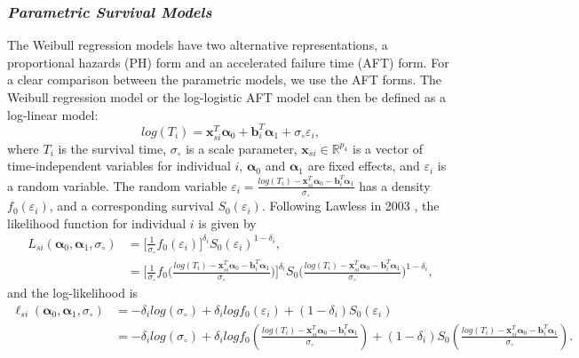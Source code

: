 \subsubsection*{\textit{Parametric Survival Models}}

The Weibull regression models have two alternative representations, a proportional hazards (PH) form and an accelerated failure time (AFT) form. For a clear comparison between the parametric models, we use the AFT forms. The Weibull regression model or the log-logistic AFT model can then be defined as a log-linear model:
\begin{equation}
    log(T_i) = \boldsymbol{x}_{si}^T \boldsymbol{\alpha}_0 + \boldsymbol{b}_i^T  \boldsymbol{\alpha}_1 +\sigma_{\circ} \varepsilon_i,
\end{equation}
where $T_i$ is the survival time, $\sigma_{\circ}$ is a scale parameter, $\boldsymbol{x}_{si}\in \mathbb{R}^{p_4}$ is a vector of time-independent variables for individual $i$, $\boldsymbol{\alpha}_0$ and $\boldsymbol{\alpha}_1$ are fixed effects, and $\varepsilon_i$ is a random variable. The random variable $\varepsilon_i = \frac{log(T_i) - \boldsymbol{x}_{si}^T \boldsymbol{\alpha}_0 - \boldsymbol{b}_i^T  \boldsymbol{\alpha}_1}{\sigma_{\circ} }$ has a density $f_0(\varepsilon_i)$, and a corresponding survival $S_0(\varepsilon_i)$.
Following Lawless in 2003 \cite{lawless2011statistical}, the likelihood function for individual $i$ is given by
\begin{equation}
    \begin{split}
        L_{si} (\boldsymbol{\alpha}_0,\boldsymbol{\alpha}_1,\sigma_{\circ}) &= \Big[ \frac{1}{\sigma_{\circ}} f_0(\varepsilon_i) \Big]^{\delta_i} S_0(\varepsilon_i)^{1-\delta_i}, \\
        &=  \Big[ \frac{1}{\sigma_{\circ}} f_0 \big( \frac{log(T_i) - \boldsymbol{x}_{si}^T \boldsymbol{\alpha}_0 - \boldsymbol{b}_i^T  \boldsymbol{\alpha}_1}{\sigma_{\circ} } \big) \Big]^{\delta_i} 
        S_0 \big( \frac{log(T_i) - \boldsymbol{x}_{si}^T \boldsymbol{\alpha}_0 - \boldsymbol{b}_i^T  \boldsymbol{\alpha}_1}{\sigma_{\circ} } \big)^{1-\delta_i},
    \end{split}
\end{equation}
and the log-likelihood is 
\begin{equation}
    \begin{split}
         \ell_{si} (\boldsymbol{\alpha}_0,\boldsymbol{\alpha}_1,\sigma_{\circ}) &= -\delta_i log(\sigma_{\circ}) + \delta_i log f_0(\varepsilon_i) + (1-\delta_i) S_0(\varepsilon_i) \\ 
         &= -\delta_i log(\sigma_{\circ}) + \delta_i log f_0(\frac{log(T_i) - \boldsymbol{x}_{si}^T \boldsymbol{\alpha}_0 - \boldsymbol{b}_i^T  \boldsymbol{\alpha}_1}{\sigma_{\circ} }) + (1-\delta_i) S_0(\frac{log(T_i) - \boldsymbol{x}_{si}^T \boldsymbol{\alpha}_0 - \boldsymbol{b}_i^T  \boldsymbol{\alpha}_1}{\sigma_{\circ} }).
    \end{split}
    \label{eq:logSurv}
\end{equation}

